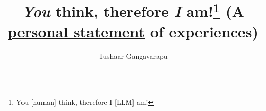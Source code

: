 \documentclass[
    final,
    boldauth,
]{statement}
\title{\textit{You} think, therefore \textit{I} am!\footnote{You [human] think, therefore I [LLM] am!} (A \underline{personal statement} of experiences)
}
\author{Tushaar Gangavarapu}
\begin{document}
\maketitle





\rrule  %


\thecollegespecificpersonal



\end{document}
